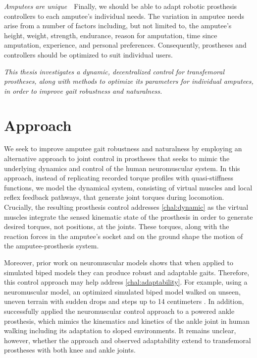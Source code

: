\begin{challenges}
    \item\label{chal:amputees_unique} \emph{Amputees are unique}~~Finally, we
    should be able to adapt robotic prosthesis controllers to each amputee's
    individual needs. The variation in amputee needs arise from a number of
    factors including, but not limited to, the amputee's height, weight,
    strength, endurance, reason for amputation, time since amputation,
    experience, and personal preferences. Consequently, prostheses and
    controllers should be optimized to suit individual users.
\end{challenges}

\begin{fullwidth} 
\emph{This thesis investigates a dynamic, decentralized control for transfemoral
prostheses, along with methods to optimize its parameters for individual
amputees, in order to improve gait robustness and naturalness.} 
\end{fullwidth}

\section{Approach}\label{sec:intro_approach}

We seek to improve amputee gait robustness and naturalness by employing an
alternative approach to joint control in prostheses that seeks to mimic the
underlying dynamics and control of the human neuromuscular system. In this
approach, instead of replicating recorded torque profiles with quasi-stiffness
functions, we model the dynamical system, consisting of virtual muscles and
local reflex feedback pathways, that generate joint torques during locomotion.
Crucially, the resulting prosthesis control addresses \cref{chal:dynamic} as the
virtual muscles integrate the sensed kinematic state of the prosthesis in order
to generate desired torques, not positions, at the joints. These torques, along
with the reaction forces in the amputee's socket and on the ground shape the
motion of the amputee-prosthesis system.

Moreover, prior work on neuromuscular models shows that when applied to
simulated biped models they can produce robust and adaptable gaits. Therefore,
this control approach may help address \cref{chal:adaptability}. For example,
using a neuromuscular model, an optimized simulated biped model walked on
unseen, uneven terrain with sudden drops and steps up to 14 centimeters
\citep{song2015neural}. In addition, \citet{eilenberg2010control} successfully
applied the neuromuscular control approach to a powered ankle prosthesis, which
mimics the kinematics and kinetics of the ankle joint in human walking including
its adaptation to sloped environments.  It remains unclear, however, whether the
approach and observed adaptability extend to transfemoral prostheses with both
knee and ankle joints.

